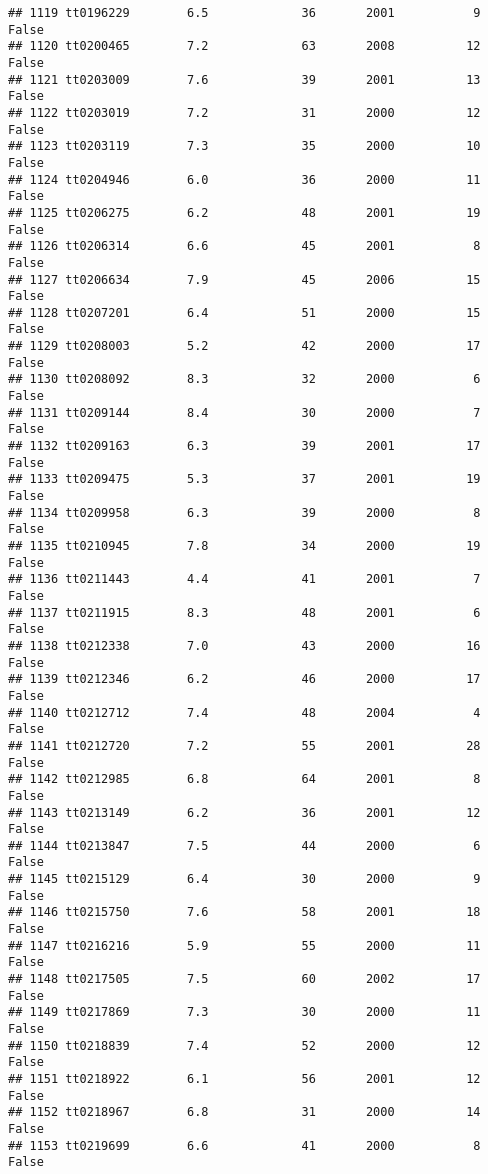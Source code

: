 \documentclass[
]{article}
\begin{document}
\begin{verbatim}
## 1119 tt0196229        6.5             36       2001           9   False
## 1120 tt0200465        7.2             63       2008          12   False
## 1121 tt0203009        7.6             39       2001          13   False
## 1122 tt0203019        7.2             31       2000          12   False
## 1123 tt0203119        7.3             35       2000          10   False
## 1124 tt0204946        6.0             36       2000          11   False
## 1125 tt0206275        6.2             48       2001          19   False
## 1126 tt0206314        6.6             45       2001           8   False
## 1127 tt0206634        7.9             45       2006          15   False
## 1128 tt0207201        6.4             51       2000          15   False
## 1129 tt0208003        5.2             42       2000          17   False
## 1130 tt0208092        8.3             32       2000           6   False
## 1131 tt0209144        8.4             30       2000           7   False
## 1132 tt0209163        6.3             39       2001          17   False
## 1133 tt0209475        5.3             37       2001          19   False
## 1134 tt0209958        6.3             39       2000           8   False
## 1135 tt0210945        7.8             34       2000          19   False
## 1136 tt0211443        4.4             41       2001           7   False
## 1137 tt0211915        8.3             48       2001           6   False
## 1138 tt0212338        7.0             43       2000          16   False
## 1139 tt0212346        6.2             46       2000          17   False
## 1140 tt0212712        7.4             48       2004           4   False
## 1141 tt0212720        7.2             55       2001          28   False
## 1142 tt0212985        6.8             64       2001           8   False
## 1143 tt0213149        6.2             36       2001          12   False
## 1144 tt0213847        7.5             44       2000           6   False
## 1145 tt0215129        6.4             30       2000           9   False
## 1146 tt0215750        7.6             58       2001          18   False
## 1147 tt0216216        5.9             55       2000          11   False
## 1148 tt0217505        7.5             60       2002          17   False
## 1149 tt0217869        7.3             30       2000          11   False
## 1150 tt0218839        7.4             52       2000          12   False
## 1151 tt0218922        6.1             56       2001          12   False
## 1152 tt0218967        6.8             31       2000          14   False
## 1153 tt0219699        6.6             41       2000           8   False

\end{verbatim}
\end{document}
